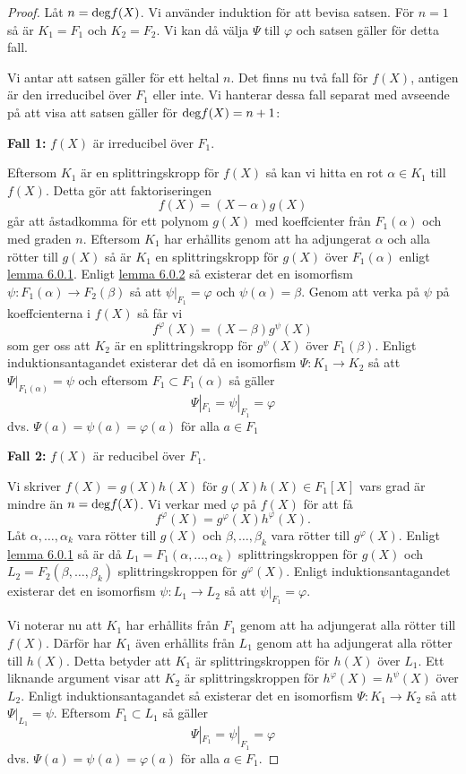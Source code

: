\documentclass{article}
\newcommand{\grad}[0]{\textnormal{deg}}
\theoremstyle{definition}
\begin{document}
\begin{proof}
  Låt $n = \grad f(X)$. Vi använder induktion för att bevisa satsen. För $n = 1$ så är $K_1 = F_1$ och $K_2 = F_2$. Vi kan då välja 
  $\Psi$ till $\varphi$ och satsen gäller för detta fall. 

  Vi antar att satsen gäller för ett heltal $n$. Det finns nu två fall för $f(X)$, antigen är den irreducibel över $F_1$ eller inte. Vi hanterar dessa fall separat
  med avseende på att visa att satsen gäller för $\grad f(X) = n+1$:

  \textbf{Fall 1:} $f(X)$ är irreducibel över $F_1$. 

  Eftersom $K_1$ är en splittringskropp för $f(X)$ så kan vi hitta en rot $\alpha \in K_1$ till $f(X)$. Detta gör att faktoriseringen 
  \[f(X) = (X-\alpha)g(X)\]
  går att åstadkomma för ett polynom $g(X)$ med koeffcienter från $F_1(\alpha)$ och med graden $n$. Eftersom $K_1$ har erhållits genom att ha adjungerat $\alpha$ 
  och alla rötter till $g(X)$ så är $K_1$ en splittringskropp för $g(X)$ över $F_1(\alpha)$ enligt \hyperlink{lemma6.0.1}{lemma 6.0.1}.
  Enligt \hyperlink{6.0.2}{lemma 6.0.2} så existerar det en isomorfism 
  $\psi: F_1(\alpha) \rightarrow F_2(\beta)$ så att $\psi |_{F_1} = \varphi$ och $\psi(\alpha) = \beta.$ Genom att verka på $\psi$ på koeffcienterna i $f(X)$
  så får vi 
  \[f^{\varphi}(X) = (X - \beta)g^{\psi}(X)\]
  som ger oss att $K_2$ är en splittringskropp för $g^{\psi}(X)$ över $F_1(\beta)$. Enligt induktionsantagandet existerar det då en isomorfism $\Psi: K_1 \rightarrow K_2$
  så att $\Psi |_{F_1(\alpha)} = \psi$ och eftersom $F_1 \subset F_1(\alpha)$ så gäller 
  \[\Psi |_{F_1} = \psi |_{F_1} = \varphi\]
  dvs. $\Psi(a) = \psi(a) = \varphi(a)$ för alla $a \in F_1$

  \textbf{Fall 2:} $f(X)$ är reducibel över $F_1$.

Vi skriver $f(X) = g(X)h(X)$ för $g(X)h(X) \in F_1[X]$ vars grad är mindre än $n = \grad f(X)$. Vi verkar med $\varphi$ på $f(X)$ för att få 
\[f^{\varphi}(X) = g^{\varphi}(X)h^{\varphi}(X). \]
Låt $\alpha, \ldots, \alpha_k$ vara rötter till $g(X)$ och $\beta, \ldots, \beta_k$ vara rötter till $g^{\varphi}(X).$
Enligt \hyperlink{lemma6.0.1}{lemma 6.0.1} så är då $L_1 = F_1(\alpha, \ldots, \alpha_k)$ splittringskroppen för $g(X)$ och 
$L_2 = F_2(\beta, \ldots, \beta_k)$ splittringskroppen för $g^{\varphi}(X).$ Enligt induktionsantagandet existerar det en 
isomorfism $\psi: L_1 \rightarrow L_2$ så att $\psi |_{F_1} = \varphi.$

Vi noterar nu att $K_1$ har erhållits från $F_1$ genom att ha adjungerat alla rötter till $f(X)$. Därför har $K_1$ även erhållits
från $L_1$ genom att ha adjungerat alla rötter till $h(X)$. Detta betyder att $K_1$ är splittringskroppen för $h(X)$ över $L_1$. Ett liknande 
argument visar att $K_2$ är splittringskroppen för $h^{\varphi}(X) = h^{\psi}(X)$ över $L_2$. Enligt induktionsantagandet så existerar det 
en isomorfism $\Psi: K_1 \rightarrow K_2$ så att $\Psi |_{L_1} = \psi$. Eftersom $F_1 \subset L_1$ så gäller 
\[\Psi |_{F_1} = \psi |_{F_1} = \varphi\]
dvs. $\Psi(a) = \psi(a) = \varphi(a)$ för alla $a \in F_1$. 
\end{proof}
\end{document}
